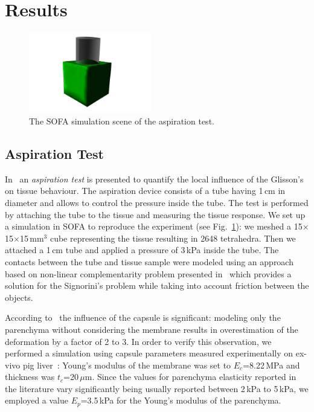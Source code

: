 \section{Results} %
\begin{figure}[t]
  \centering
  \includegraphics[height=3.5cm]{figures/aspirationScreenshot.jpg}
  \caption{\label{fig-aspiration1} The SOFA simulation scene of the aspiration test.}
\end{figure}
\subsection{Aspiration Test}
In~\cite{Hollenstein2006} an \emph{aspiration test} is presented to quantify the local influence of the Glisson's on tissue behaviour.
The aspiration device consists of a tube having 1\,cm in diameter and allows to
control the pressure inside the tube. The test is performed by
attaching the tube to the tissue and measuring the tissue response. We
set up a simulation in SOFA to reproduce the experiment (see
Fig.~\ref{fig-aspiration1}): we meshed a 15$\times$15$\times$15\,mm$^3$ 
cube representing the tissue resulting in 2648 tetrahedra. Then we attached a 1\,cm tube 
and applied a pressure of 3\,kPa inside the tube. The contacts between the tube and tissue sample were modeled using 
an approach based on non-linear complementarity problem presented in~\cite{Duriez2006b} which provides a solution for 
the Signorini's problem while taking into account friction between the objects.

According to~\cite{Hollenstein2006} the influence of the capsule is significant: modeling 
only the parenchyma without considering the membrane results in overestimation of the deformation by a factor of 2 to 3. 
In order to verify this observation, we performed a simulation using capsule parameters measured experimentally on 
ex-vivo pig liver~\cite{Umale2011}: Young's modulus of the membrane was set to $E_c$=8.22\,MPa and thickness was
$t_c$=20\,$\mu$m. 
Since the values for parenchyma elasticity reported in the literature vary significantly being usually reported between 2\,kPa to 5\,kPa, 
we employed a value $E_p$=3.5\,kPa for the Young's modulus of the parenchyma. 

